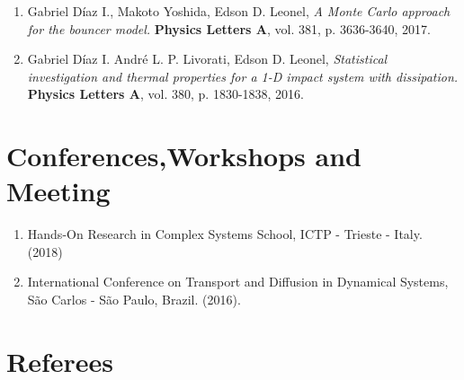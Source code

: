 \documentclass[margin,line]{resume}
\begin{document}
\begin{resume}
\begin{enumerate}
\item Gabriel D\'iaz I., Makoto Yoshida, Edson D. Leonel, {\it A Monte Carlo approach for the bouncer model.} {\bf Physics Letters A}, vol. 381, p. 3636-3640, 2017.

\item Gabriel D\'iaz I. Andr\'e L. P. Livorati, Edson D. Leonel, {\it Statistical investigation and thermal properties for a 1-D impact system with dissipation.} {\bf Physics Letters A}, vol. 380, p. 1830-1838, 2016.
\end{enumerate}

    
      \section{\mysidestyle Conferences,Workshops and Meeting}  
    
    \begin{enumerate}
\item  Hands-On Research in Complex Systems School, ICTP - Trieste - Italy. (2018)     
\item  International Conference on Transport and Diffusion in Dynamical Systems, S\~ao Carlos - S\~ao Paulo, Brazil. (2016).

\end{enumerate}


\section{\mysidestyle Referees} 



\end{resume}
\end{document}

